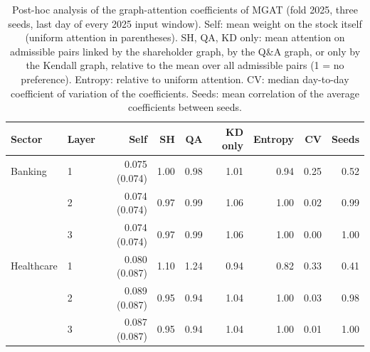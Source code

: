 \begin{table}[!t]\centering\small\color{blue}
\caption{Post-hoc analysis of the graph-attention coefficients of MGAT (fold 2025, three seeds, last day of every 2025 input window). Self: mean weight on the stock itself (uniform attention in parentheses). SH, QA, KD only: mean attention on admissible pairs linked by the shareholder graph, by the Q\&A graph, or only by the Kendall graph, relative to the mean over all admissible pairs (1 = no preference). Entropy: relative to uniform attention. CV: median day-to-day coefficient of variation of the coefficients. Seeds: mean correlation of the average coefficients between seeds.}
\label{tab:attention}
\setlength{\tabcolsep}{3pt}
\begin{tabular}{llrrrrrrr}\toprule
Sector & Layer & Self & SH & QA & KD only & Entropy & CV & Seeds \\ \midrule
Banking & 1 & 0.075 (0.074) & 1.00 & 0.98 & 1.01 & 0.94 & 0.25 & 0.52 \\
 & 2 & 0.074 (0.074) & 0.97 & 0.99 & 1.06 & 1.00 & 0.02 & 0.99 \\
 & 3 & 0.074 (0.074) & 0.97 & 0.99 & 1.06 & 1.00 & 0.00 & 1.00 \\
\midrule
Healthcare & 1 & 0.080 (0.087) & 1.10 & 1.24 & 0.94 & 0.82 & 0.33 & 0.41 \\
 & 2 & 0.089 (0.087) & 0.95 & 0.94 & 1.04 & 1.00 & 0.03 & 0.98 \\
 & 3 & 0.087 (0.087) & 0.95 & 0.94 & 1.04 & 1.00 & 0.01 & 1.00 \\
\bottomrule\end{tabular}
\end{table}